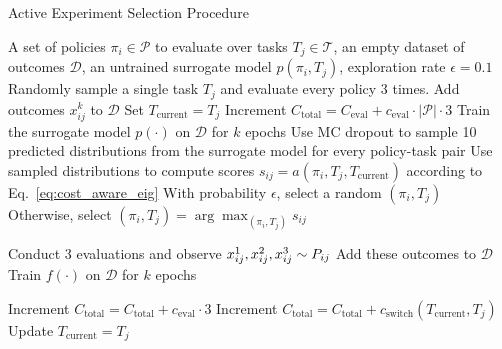 \begin{algorithm}
\caption{Active Experiment Selection Procedure}
\label{alg:short_pseudocode}
\begin{algorithmic}[1]
\Require A set of policies $\pi_i \in \mathcal{P}$ to evaluate over tasks $T_j \in \mathcal{T}$, an empty dataset of outcomes $\mathcal{D}$, an untrained surrogate model $p(\pi_i, T_j)$, exploration rate $\epsilon = 0.1$
\State Randomly sample a single task $T_j$ and evaluate every policy 3 times. Add outcomes $x_{ij}^k$ to $\mathcal{D}$
\State Set $T_{\text{current}} = T_j$
\State Increment $C_\text{total} = C_\text{eval} + c_\text{eval} \cdot |\mathcal{P}| \cdot 3$ 
\State Train the surrogate model $p(\cdot)$ on $\mathcal{D}$ for $k$ epochs
    \State Use MC dropout to sample 10 predicted distributions from the surrogate model for every policy-task pair
    \State Use sampled distributions to compute scores $s_{ij}=a(\pi_i, T_j, T_\text{current})$ according to Eq.~\ref{eq:cost_aware_eig}
    \State With probability $\epsilon$, select a random $(\pi_i, T_j)$
    \State Otherwise, select $(\pi_i, T_j) = \arg\max_{(\pi_i, T_j)} s_{ij}$

    \State Conduct 3 evaluations and observe  $x_{ij}^1, x_{ij}^2, x_{ij}^3 \sim P_{ij}$
    \State Add these outcomes to $\mathcal{D}$
    \State Train $f(\cdot)$ on $\mathcal{D}$ for $k$ epochs

    \State Increment $C_\text{total} = C_\text{total} + c_\text{eval} \cdot 3$ 
     
        \State Increment $C_\text{total} = C_\text{total} + c_\text{switch}(T_{\text{current}}, T_j)$
        \State Update $T_{\text{current}} = T_j$
    \EndIf
\EndFor
\end{algorithmic}
\end{algorithm}
